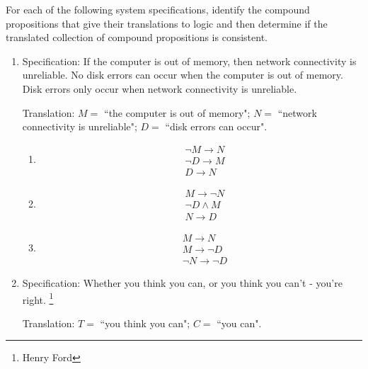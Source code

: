 
For each of  the following  system specifications, 
identify the compound propositions  that give their
translations to logic  and then determine if the
translated collection  of compound
propositions is consistent.

\begin{enumerate}
    \item Specification: If the computer is out of memory, then network connectivity is unreliable. No disk errors can occur when the computer is out of memory. Disk
    errors only occur when network connectivity is unreliable.
    
    Translation: $M =$ ``the computer is  out of memory"; $N = $ ``network connectivity
    is unreliable"; $D = $  ``disk errors  can occur".

    \begin{multicols}{3}
    \begin{enumerate}
        \item[] \begin{align*} &\neg M \to  N  \\ & \neg D \to M \\ & D \to N \end{align*}
        \item[] \begin{align*} &M \to  \neg N  \\ & \neg D \wedge M \\ & N \to D \end{align*}
        \item[] \begin{align*} &M \to  N  \\ &  M \to \neg D \\ & \neg  N \to \neg D \end{align*}
    \end{enumerate}
    \end{multicols}
    
    \item Specification: Whether you think you can, or you think you can't - you're right.
\footnote{Henry Ford}
    
    Translation: $T =$ ``you  think  you  can"; $C = $  ``you  can".
    

\end{enumerate}
